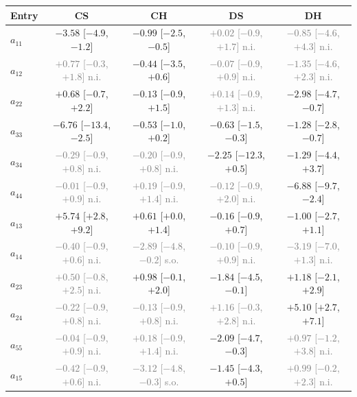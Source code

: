 \begin{tabular}{lcccc}\toprule
Entry & CS & CH & DS & DH\\
\midrule
$a_{11}$ & $-3.58$ [$-4.9$, $-1.2$] & $-0.99$ [$-2.5$, $-0.5$] & \textcolor{gray}{$+0.02$ [$-0.9$, $+1.7$] n.i.} & \textcolor{gray}{$-0.85$ [$-4.6$, $+4.3$] n.i.}\\
$a_{12}$ & \textcolor{gray}{$+0.77$ [$-0.3$, $+1.8$] n.i.} & $-0.44$ [$-3.5$, $+0.6$] & \textcolor{gray}{$-0.07$ [$-0.9$, $+0.9$] n.i.} & \textcolor{gray}{$-1.35$ [$-4.6$, $+2.3$] n.i.}\\
$a_{22}$ & $+0.68$ [$-0.7$, $+2.2$] & $-0.13$ [$-0.9$, $+1.5$] & \textcolor{gray}{$+0.14$ [$-0.9$, $+1.3$] n.i.} & $-2.98$ [$-4.7$, $-0.7$]\\
$a_{33}$ & $-6.76$ [$-13.4$, $-2.5$] & $-0.53$ [$-1.0$, $+0.2$] & $-0.63$ [$-1.5$, $-0.3$] & $-1.28$ [$-2.8$, $-0.7$]\\
$a_{34}$ & \textcolor{gray}{$-0.29$ [$-0.9$, $+0.8$] n.i.} & \textcolor{gray}{$-0.20$ [$-0.9$, $+0.8$] n.i.} & $-2.25$ [$-12.3$, $+0.5$] & $-1.29$ [$-4.4$, $+3.7$]\\
$a_{44}$ & \textcolor{gray}{$-0.01$ [$-0.9$, $+0.9$] n.i.} & \textcolor{gray}{$+0.19$ [$-0.9$, $+1.4$] n.i.} & \textcolor{gray}{$-0.12$ [$-0.9$, $+2.0$] n.i.} & $-6.88$ [$-9.7$, $-2.4$]\\
$a_{13}$ & $+5.74$ [$+2.8$, $+9.2$] & $+0.61$ [$+0.0$, $+1.4$] & $-0.16$ [$-0.9$, $+0.7$] & $-1.00$ [$-2.7$, $+1.1$]\\
$a_{14}$ & \textcolor{gray}{$-0.40$ [$-0.9$, $+0.6$] n.i.} & \textcolor{gray}{$-2.89$ [$-4.8$, $-0.2$] s.o.} & \textcolor{gray}{$-0.10$ [$-0.9$, $+0.9$] n.i.} & \textcolor{gray}{$-3.19$ [$-7.0$, $+1.3$] n.i.}\\
$a_{23}$ & \textcolor{gray}{$+0.50$ [$-0.8$, $+2.5$] n.i.} & $+0.98$ [$-0.1$, $+2.0$] & $-1.84$ [$-4.5$, $-0.1$] & $+1.18$ [$-2.1$, $+2.9$]\\
$a_{24}$ & \textcolor{gray}{$-0.22$ [$-0.9$, $+0.8$] n.i.} & \textcolor{gray}{$-0.13$ [$-0.9$, $+0.8$] n.i.} & \textcolor{gray}{$+1.16$ [$-0.3$, $+2.8$] n.i.} & $+5.10$ [$+2.7$, $+7.1$]\\
$a_{55}$ & \textcolor{gray}{$-0.04$ [$-0.9$, $+0.9$] n.i.} & \textcolor{gray}{$+0.18$ [$-0.9$, $+1.4$] n.i.} & $-2.09$ [$-4.7$, $-0.3$] & \textcolor{gray}{$+0.97$ [$-1.2$, $+3.8$] n.i.}\\
$a_{15}$ & \textcolor{gray}{$-0.42$ [$-0.9$, $+0.6$] n.i.} & \textcolor{gray}{$-3.12$ [$-4.8$, $-0.3$] s.o.} & $-1.45$ [$-4.3$, $+0.5$] & \textcolor{gray}{$+0.99$ [$-0.2$, $+2.3$] n.i.}\\

\end{tabular}

